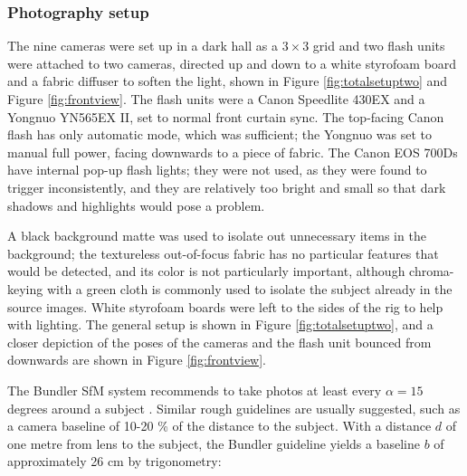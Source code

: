 \subsubsection{Photography setup}

The nine cameras were set up in a dark hall as a $3 \times 3$ grid and two flash units were attached to two cameras, directed up and down to a white styrofoam board and a fabric diffuser to soften the light, shown in Figure \ref{fig:totalsetuptwo} and Figure \ref{fig:frontview}.
The flash units were a Canon Speedlite 430EX and a Yongnuo YN565EX II, set to normal front curtain sync.
The top-facing Canon flash has only automatic mode, which was sufficient; the Yongnuo was set to manual full power, facing downwards to a piece of fabric.
The Canon EOS 700Ds have internal pop-up flash lights; they were not used, as they were found to trigger inconsistently, and they are relatively too bright and small so that dark shadows and highlights would pose a problem.

A black background matte was used to isolate out unnecessary items in the background;
the textureless out-of-focus fabric has no particular features that would be detected, and its color is not particularly important, although chroma-keying with a green cloth is commonly used to isolate the subject already in the source images.
White styrofoam boards were left to the sides of the rig to help with lighting.
The general setup is shown in Figure \ref{fig:totalsetuptwo}, and a closer depiction of the poses of the cameras and the flash unit bounced from downwards are shown in Figure \ref{fig:frontview}.



%
%


The Bundler SfM system recommends to take photos at least every $\alpha = 15$ degrees around a subject \cite{bundlerfaq}.
Similar rough guidelines are usually suggested, such as a camera baseline of 10-20 \% of the distance to the subject.
With a distance $d$ of one metre from lens to the subject, the Bundler guideline yields a baseline $b$ of approximately 26 cm by trigonometry: %

